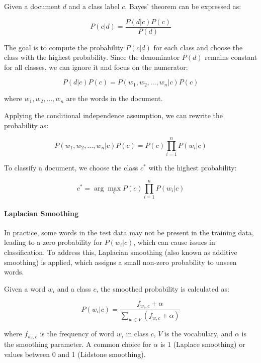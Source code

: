 \documentclass{article}
\begin{document}
Given a document $d$ and a class label $c$, Bayes' theorem can be expressed as:

\begin{equation}
P(c|d) = \frac{P(d|c)P(c)}{P(d)}
\end{equation}

The goal is to compute the probability $P(c|d)$ for each class and choose the class with the highest probability. Since the denominator $P(d)$ remains constant for all classes, we can ignore it and focus on the numerator:

\begin{equation}
P(d|c)P(c) = P(w_1, w_2, \dots, w_n|c)P(c)
\end{equation}

where $w_1, w_2, \dots, w_n$ are the words in the document.

Applying the conditional independence assumption, we can rewrite the probability as:

\begin{equation}
P(w_1, w_2, \dots, w_n|c)P(c) = P(c)\prod_{i=1}^{n} P(w_i|c)
\end{equation}

To classify a document, we choose the class $c^*$ with the highest probability:

\begin{equation}
c^* = \arg\max_c P(c)\prod_{i=1}^{n} P(w_i|c)
\end{equation}

\paragraph{Laplacian Smoothing}

In practice, some words in the test data may not be present in the training data, leading to a zero probability for $P(w_i|c)$, which can cause issues in classification. To address this, Laplacian smoothing (also known as additive smoothing) is applied, which assigns a small non-zero probability to unseen words.

Given a word $w_i$ and a class $c$, the smoothed probability is calculated as:

\begin{equation}
P(w_i|c) = \frac{f_{w_i, c} + \alpha}{\sum_{w \in V} (f_{w, c} + \alpha)}
\end{equation}

where $f_{w_i, c}$ is the frequency of word $w_i$ in class $c$, $V$ is the vocabulary, and $\alpha$ is the smoothing parameter. A common choice for $\alpha$ is 1 (Laplace smoothing) or values between 0 and 1 (Lidstone smoothing).
\end{document}
